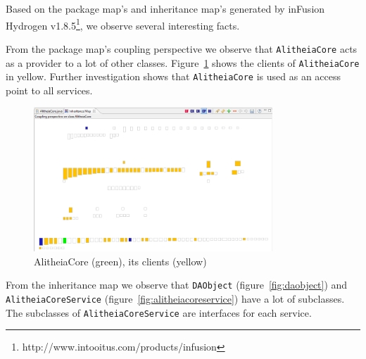 \documentclass{article}
\begin{document}
Based on the package map's and inheritance map's generated by inFusion Hydrogen v1.8.5\footnote{http://www.intooitus.com/products/infusion}, we observe several interesting facts.

From the package map's coupling perspective we observe that \verb|AlitheiaCore| acts as a provider to a lot of other classes. Figure~\ref{fig:alitheiacore} shows the clients of \verb|AlitheiaCore| in yellow. Further investigation shows that \verb|AlitheiaCore| is used as an access point to all services.

\begin{figure}[h]
    \centering
    \includegraphics[width=0.8\textwidth]{alitheiacore-coupling}
    \caption{AlitheiaCore (green), its clients (yellow)}
    \label{fig:alitheiacore}
\end{figure}

From the inheritance map we observe that \verb|DAObject| (figure~\ref{fig:daobject}) and \verb|AlitheiaCoreService| (figure~\ref{fig:alitheiacoreservice}) have a lot of subclasses. The subclasses of \verb|AlitheiaCoreService| are interfaces for each service.
\end{document}
